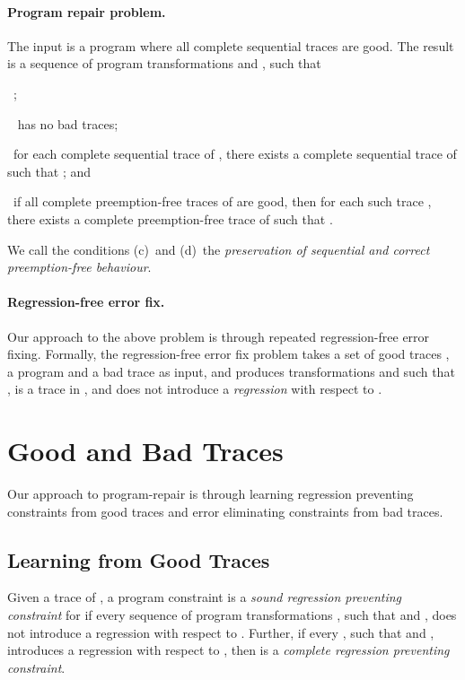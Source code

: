 \documentclass{llncs}
\begin{document}
\paragraph{Program repair problem.}
The input is a program  where all complete sequential traces are
good.
The result is a sequence of program transformations  and , such that
\begin{inparaenum}[(a)]
\item~;
\item~ has no bad traces;
\item~for each complete sequential trace  of , there
  exists a complete sequential trace  of  such that
  ; and
\item~if all complete preemption-free traces of  are good, then
  for each such trace , there exists a complete preemption-free
  trace  of  such that .
\end{inparaenum}
We call the conditions (c)~and (d)~the {\em preservation of sequential and
correct preemption-free behaviour}.



\paragraph{Regression-free error fix.}
Our approach to the above problem is through repeated
regression-free error fixing.
Formally, the regression-free error fix problem takes a set of good
traces , a program  and a bad trace  as input,
and produces transformations  and 
such that ,
 is a trace
in , and  does not introduce a {\em
regression} with respect to .


\section{Good and Bad Traces}

Our approach to program-repair is through
learning regression preventing constraints from good traces 
and error eliminating constraints from bad traces.


\subsection{Learning from Good Traces}
\label{sec:learn_good}

Given a trace  of , a program constraint  is a
{\em sound regression preventing constraint} for  if every
sequence of program transformations ,
such that  and , does not introduce a
regression with respect to .
Further, if every , such that
 and
, introduces a regression with respect to
, then  is a {\em complete regression preventing
constraint}.
\end{document}
